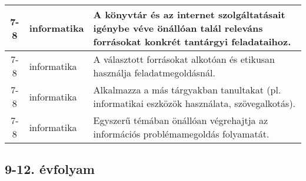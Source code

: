 \begin{small}
\begin{longtable}{c | p{2cm} |  p{11cm} }
              7-8 & informatika & A könyvtár és az internet szolgáltatásait igénybe véve önállóan talál releváns forrásokat konkrét tantárgyi feladataihoz. \\ \hline
              7-8 & informatika & A választott forrásokat alkotóan és etikusan használja feladatmegoldásnál. \\ \hline
              7-8 & informatika & Alkalmazza a más tárgyakban tanultakat (pl. informatikai eszközök használata, szövegalkotás). \\ \hline
              7-8 & informatika & Egyszerű témában önállóan végrehajtja az információs problémamegoldás folyamatát. \\ \hline
      \end{longtable}
\end{small}


\subsection{9-12. évfolyam}
